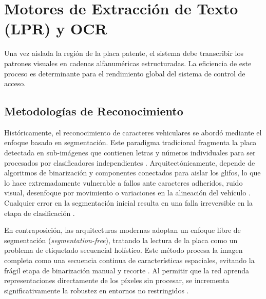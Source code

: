 \section{Motores de Extracción de Texto (LPR) y OCR}

Una vez aislada la región de la placa patente, el sistema debe transcribir los patrones 
visuales en cadenas alfanuméricas estructuradas. La eficiencia de este proceso es 
determinante para el rendimiento global del sistema de control de acceso.

\subsection{Metodologías de Reconocimiento}

Históricamente, el reconocimiento de caracteres vehiculares se abordó mediante el enfoque 
basado en segmentación. Este paradigma tradicional fragmenta la placa detectada en 
sub-imágenes que contienen letras y números individuales para ser procesados por 
clasificadores independientes \parencite{xuDeepLearningAlgorithms2026c}. 
Arquitectónicamente, depende de algoritmos de binarización y componentes conectados para 
aislar los glifos, lo que lo hace extremadamente vulnerable a fallos ante caracteres 
adheridos, ruido visual, desenfoque por movimiento o variaciones en la alineación del vehículo 
\parencite{sonnaraEfficientRealtimeLicense2025, xuDeepLearningAlgorithms2026c, zherzdevLPRNetLicensePlate2018}. 
Cualquier error en la segmentación inicial resulta en una falla irreversible en la etapa de 
clasificación \parencite{xiongLicensePlateRecognition2026}.

En contraposición, las arquitecturas modernas adoptan un enfoque libre de segmentación 
(\textit{segmentation-free}), tratando la lectura de la placa como un problema de etiquetado 
secuencial holístico. Este método procesa la imagen completa como una secuencia continua de 
características espaciales, evitando la frágil etapa de binarización manual y recorte 
\parencite{kuyunsaDeepLearningEnhancedAutomatic2025, xuDeepLearningAlgorithms2026c}. 
Al permitir que la red aprenda representaciones directamente de los píxeles sin procesar, 
se incrementa significativamente la robustez en entornos no restringidos 
\parencite{PDFRealTimeLicense2026, sonnaraEfficientRealtimeLicense2025}.

